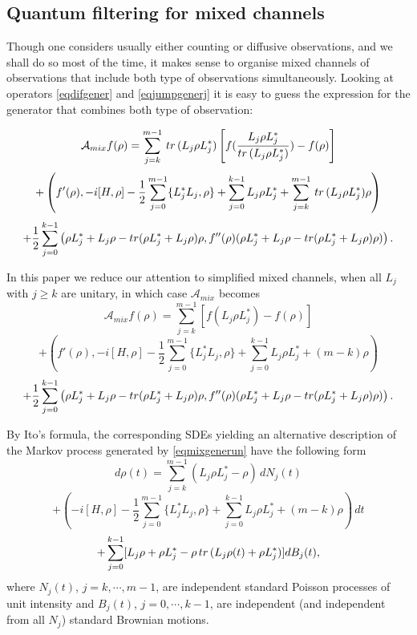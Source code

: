 \documentclass[10pt,a4paper]{amsart}
\def\AC{\mathcal{A}}
\def\tr{\rm{tr}}
\begin{document}
\subsection{Quantum filtering for mixed channels}

Though one considers usually either counting or diffusive observations, and we shall do so most of the time,
it makes sense to organise mixed channels of observations that include both type of observations simultaneously.
Looking at operators \eqref{eqdifgener} and \eqref{eqjumpgenerj} it is easy to guess the expression for the generator
that combines both type of observation:

\[
\AC_{mix}f(\rho)
=\sum_{j=k}^{m-1} \, {\tr} \, (L_j\rho L_j^*)  \left[f(\frac{ L_j \rho  L_j^*}{ {\tr} \, (L_j\rho L_j^*)})-f(\rho)\right]
\]
\[
+\left(f'(\rho), -i[H, \rho] -\frac12 \sum_{j=0}^{m-1}\{ L_j^* L_j,\rho\}
+\sum_{j=0}^{k-1} L_j \rho  L_j^*
+\sum_{j=k}^{m-1}  \, {\tr} \, (L_j\rho L_j^*) \rho \right)
\]
\begin{equation}
\label{eqmixgener}
+\frac12 \sum_{j=0}^{k-1}  \left(\rho  L_j^* +  L_j\rho- {\tr} (\rho L_j^* +L_j \rho)\rho,
f''(\rho)  (\rho  L_j^* +  L_j\rho- {\tr} (\rho L_j^* +L_j \rho) \rho)\right).
\end{equation}

In this paper we reduce our attention to simplified mixed channels,
when all $L_j$ with $j\ge k$ are unitary,
in which case $\AC_{mix}$ becomes
\[
\AC_{mix}f(\rho)
=\sum_{j=k}^{m-1} \left[f(L_j \rho  L_j^*)-f(\rho)\right]
\]
\[
+\left(f'(\rho), -i[H, \rho] -\frac12 \sum_{j=0}^{m-1}\{ L_j^* L_j,\rho\}
+\sum_{j=0}^{k-1} L_j \rho  L_j^* +(m-k) \rho \right)
\]
\begin{equation}
\label{eqmixgenerun}
+\frac12 \sum_{j=0}^{k-1}  \left(\rho  L_j^* +  L_j\rho- {\tr} (\rho L_j^* +L_j \rho)\rho,
f''(\rho)  (\rho  L_j^* +  L_j\rho- {\tr} (\rho L_j^* +L_j \rho) \rho)\right).
\end{equation}

By Ito's formula, the corresponding SDEs yielding an alternative description
of the Markov process generated by \eqref{eqmixgenerun} have the following form
\[
d\rho(t)=\sum_{j=k}^{m-1} (L_j\rho L_j^*-\rho) \, dN_j(t)
\]
\[
+\left( -i[H, \rho] -\frac12 \sum_{j=0}^{m-1}\{ L_j^* L_j,\rho\}
+\sum_{j=0}^{k-1} L_j \rho  L_j^* +(m-k) \rho \right)\, dt
\]
\begin{equation}
\label{Lindstochmix}
+\sum_{j=0}^{k-1} [L_j\rho+\rho L_j^*-\rho\, {\tr} \, (L_j\rho(t)+\rho L_j^*) ] dB_j(t),
\end{equation}
where $N_j(t)$, $j=k, \cdots, m-1$, are independent standard Poisson processes of unit intensity
and $B_j(t)$, $j=0,\cdots, k-1$, are independent (and independent from all $N_j$) standard Brownian motions.
\end{document}
